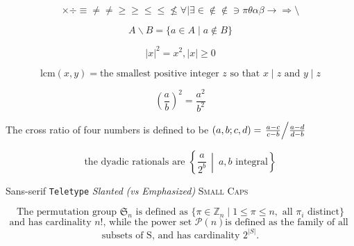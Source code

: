 \documentclass[10pt]{article}
\begin{document}
$$  \times  \div  \equiv  \neq  \ne  \geq  \ge  \leq  \le  \not\le  \forall  \mid  \exists  \in  \not\in  \notin  \ni  \pi  \theta  \alpha  \beta  \rightarrow  \Rightarrow \setminus  $$

$$ A \backslash B = \{ a \in A \mid a \not\in B\}$$

$$    |x| ^2  = x^2,  |x| \geq 0  $$

$$    \textrm{lcm}(x,y) = \textrm{the smallest positive integer } z \textrm{ so that } x \mid z \textrm{ and } y \mid z$$


$$ \left( \frac{a}{b} \right)^2 = \frac{a^2}{b^2} $$

The cross ratio of four numbers is defined to be
$ (a,b;c,d) = \left. \frac{a-c}{c-b} \middle/ \frac{a-d}{d-b} \right. $

$$ \textrm{the dyadic rationals are } \left\{ \frac{a}{2^b} \, \middle| \: a,b \textrm{ integral}  \right\}  $$

\textsf{Sans-serif} \texttt{Teletype} \textsl{Slanted} \emph{(vs Emphasized)} \textsc{Small Caps}

$$ \textrm{The permutation group } \mathfrak{S} _n \textrm{ is defined as } \{  \pi \in \mathbb{Z}_n \mid 1 \leq \pi \leq n,  \textrm{ all } \pi_i  \textrm{ distinct} \} $$ 
$$ \textrm{and has cardinality } n! \textrm{, while the power set } \mathcal{P}(n) \textrm{is defined as the family of all }$$
$$ \textrm{subsets of S} \textrm{,  and has cardinality } 2^{|S|}.   $$
\end{document}
